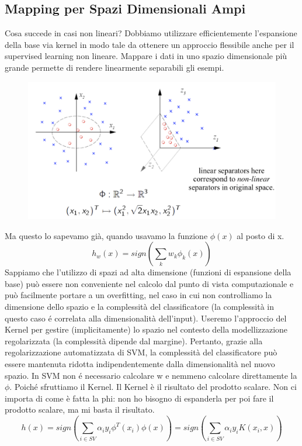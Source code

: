 \documentclass{article}
\begin{document}
\subsection{Mapping per Spazi Dimensionali Ampi}
Cosa succede in casi non lineari? Dobbiamo utilizzare efficientemente l'espansione della base via kernel in modo tale da ottenere un approccio flessibile anche per il supervised learning non lineare. Mappare i dati in uno spazio dimensionale più grande permette di rendere linearmente separabili gli esempi.
\begin{figure}[H]
\centering
\includegraphics[scale=0.35]{Images/Mappingtohighdim.png}
\end{figure}
Ma questo lo sapevamo già, quando usavamo la funzione $\phi(x)$ al posto di x. 
\[ h_w(x)=sign(\sum_kw_k\phi_k(x))\]
Sappiamo che l'utilizzo di spazi ad alta dimensione (funzioni di espansione della base) può essere non conveniente nel calcolo dal punto di vista computazionale e può facilmente portare a un overfitting, nel caso in cui non controlliamo la dimensione dello spazio e la complessità del classificatore (la complessità in questo caso é correlata alla dimensionalità dell'input). Useremo l'approccio del Kernel per gestire (implicitamente) lo spazio nel contesto della modellizzazione regolarizzata (la complessità dipende dal margine). Pertanto, grazie alla regolarizzazione automatizzata di SVM, la complessità del classificatore può essere mantenuta ridotta indipendentemente dalla dimensionalità nel nuovo spazio. \newline
In SVM non é necessario calcolare w e nemmeno calcolare direttamente la $\phi$. Poiché sfruttiamo il Kernel. Il Kernel è il risultato del prodotto scalare. Non ci importa di come è fatta la phi: non ho bisogno di espanderla per poi fare il prodotto scalare, ma mi basta il risultato.
\[ h(x)=sign(\sum_{i\in SV} \alpha_iy_i\phi^T(x_i)\phi(x)) = sign(\sum_{i\in SV} \alpha_iy_iK(x_i,x))\]
\end{document}
